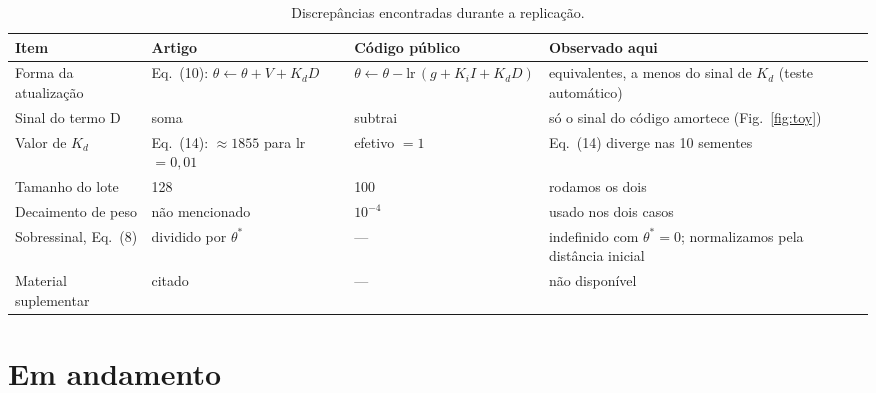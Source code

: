 \documentclass[11pt,a4paper]{article}
\begin{document}
\begin{table}[!htbp]
  \centering\small
  \caption{Discrepâncias encontradas durante a replicação.}
  \label{tab:discrepancias}
  \begin{tabular}{>{\raggedright}p{2.6cm}>{\raggedright}p{4.3cm}>{\raggedright}p{3.6cm}p{3.6cm}}
    \toprule
    Item & Artigo & Código público & Observado aqui \\
    \midrule
    Forma da atualização & Eq.~(10): $\theta \leftarrow \theta + V + K_d D$ &
      $\theta \leftarrow \theta - \text{lr}\,(g + K_i I + K_d D)$ &
      equivalentes, a menos do sinal de $K_d$ (teste automático) \\
    Sinal do termo D & soma & subtrai & só o sinal do código amortece (Fig.~\ref{fig:toy}) \\
    Valor de $K_d$ & Eq.~(14): $\approx 1855$ para lr $=0{,}01$ & efetivo $= 1$ &
      Eq.~(14) diverge nas 10 sementes \\
    Tamanho do lote & 128 & 100 & rodamos os dois \\
    Decaimento de peso & não mencionado & $10^{-4}$ & usado nos dois casos \\
    Sobressinal, Eq.~(8) & dividido por $\theta^*$ & --- & indefinido com $\theta^* = 0$; normalizamos pela distância inicial \\
    Material suplementar & citado & --- & não disponível \\
    \bottomrule
  \end{tabular}
\end{table}

\section{Em andamento}
\end{document}
